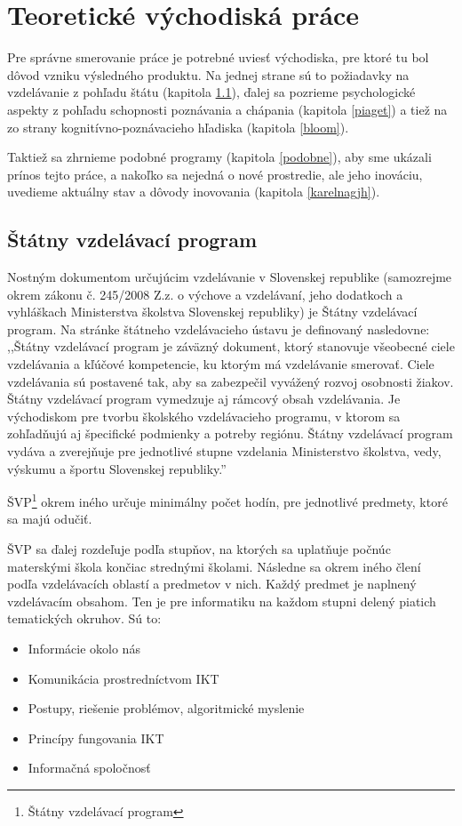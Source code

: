 \chapter{Teoretické východiská práce}

Pre správne smerovanie práce je potrebné uviesť východiska, pre ktoré tu bol dôvod vzniku výsledného produktu.
Na jednej strane sú to požiadavky na vzdelávanie z pohľadu štátu (kapitola \ref{svp}), ďalej sa pozrieme psychologické aspekty z pohľadu schopnosti poznávania a chápania (kapitola \ref{piaget}) a tiež na zo strany kognitívno-poznávacieho hľadiska (kapitola \ref{bloom}).

Taktiež sa zhrnieme podobné programy (kapitola \ref{podobne}), aby sme ukázali prínos tejto práce, a nakoľko sa nejedná o nové prostredie, ale jeho inováciu, uvedieme aktuálny stav a dôvody inovovania (kapitola \ref{karelnagjh}).

\section{Štátny vzdelávací program} \label{svp}

Nostným dokumentom určujúcim vzdelávanie v Slovenskej republike (samozrejme okrem zákonu č. 245/2008 Z.z. o výchove a vzdelávaní, jeho dodatkoch a vyhláškach Ministerstva školstva Slovenskej republiky) je Štátny vzdelávací program.
Na stránke štátneho vzdelávacieho ústavu \cite{statpedu,svp} je definovaný nasledovne:
,,Štátny vzdelávací program je záväzný dokument, ktorý stanovuje všeobecné ciele vzdelávania a kľúčové kompetencie, ku ktorým má vzdelávanie smerovať. 
Ciele vzdelávania sú postavené tak, aby sa zabezpečil vyvážený rozvoj osobnosti žiakov. 
Štátny vzdelávací program vymedzuje aj rámcový obsah vzdelávania. 
Je východiskom pre tvorbu školského vzdelávacieho programu, v ktorom sa zohľadňujú aj špecifické podmienky a potreby regiónu. 
Štátny vzdelávací program vydáva a zverejňuje pre jednotlivé stupne vzdelania Ministerstvo školstva, vedy, výskumu a športu Slovenskej republiky.''

ŠVP\footnote{Štátny vzdelávací program} okrem iného určuje minimálny počet hodín, pre jednotlivé predmety, ktoré sa majú odučiť.

ŠVP sa ďalej rozdeľuje podľa stupňov, na ktorých sa uplatňuje počnúc materskými škola končiac strednými školami.
Následne sa okrem iného člení podľa vzdelávacích oblastí a predmetov v nich.
Každý predmet je naplnený vzdelávacím obsahom.
Ten je pre informatiku na každom stupni delený piatich tematických okruhov.
Sú to:
\begin{itemize}
    \item Informácie okolo nás
    \item Komunikácia prostredníctvom IKT
    \item Postupy, riešenie problémov, algoritmické myslenie
    \item Princípy fungovania IKT
    \item Informačná spoločnosť
\end{itemize}

